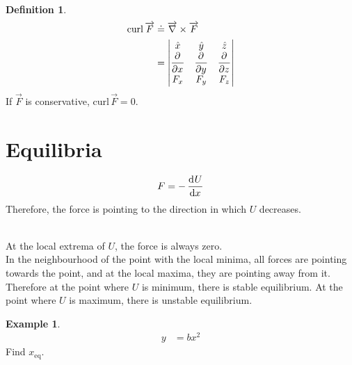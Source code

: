\documentclass[fleqn]{article}
\theoremstyle{definition}
\newtheorem{example}{Example}
\newtheorem{definition}{Definition}
\theoremstyle{theorem}
\newcommand{\curl}{\mathrm{curl\,}}
\begin{document}
\begin{definition}
	\begin{align*}
		\curl \overrightarrow{F} &\doteq \overrightarrow{\nabla} \times \overrightarrow{F} \\
		&=
		\begin{vmatrix} 
			\hat{x} & \hat{y} & \hat{z} \\
			\dpd{}{x} & \dpd{}{y} & \dpd{}{z} \\
			F_x & F_y & F_z \\
		\end{vmatrix}
	\end{align*}
	If $\overrightarrow{F}$ is conservative, $\curl \overrightarrow{F} = 0$.
\end{definition}

\section{Equilibria}

\begin{equation*}
	F = -\dod{U}{x}
\end{equation*}
Therefore, the force is pointing to the direction in which $U$ decreases.

\\
At the local extrema of $U$, the force is always zero. \\
In the neighbourhood of the point with the local minima, all forces are pointing towards the point, and at the local maxima, they are pointing away from it.\\
Therefore at the point where $U$ is minimum, there is stable equilibrium. At the point where $U$ is maximum, there is unstable equilibrium.

\begin{example}
	\begin{align*}
		y &= b x^2
	\end{align*}
	Find $x_{\text{eq}}$.
\end{example}
\end{document}
